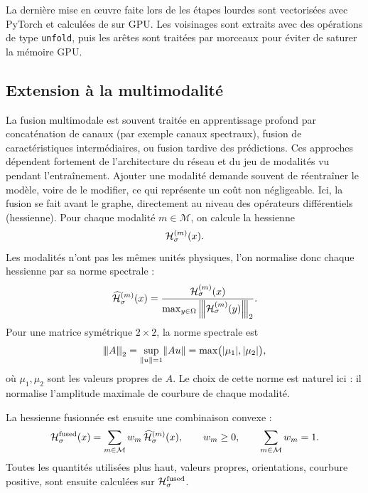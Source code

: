 La dernière mise en œuvre \cite{BibiISPRS} faite lors de les étapes lourdes sont vectorisées avec PyTorch et calculées de sur GPU. Les voisinages sont extraits avec des opérations de type \texttt{unfold}, puis les arêtes sont traitées par morceaux pour éviter de saturer la mémoire GPU.

\subsection{Extension à la multimodalité}
\label{subsec:chapIII_multimodalite}

La fusion multimodale est souvent traitée en apprentissage profond par concaténation de canaux (par exemple canaux spectraux), fusion de caractéristiques intermédiaires, ou fusion tardive des prédictions. 
Ces approches dépendent fortement de l'architecture du réseau et du jeu de modalités vu pendant l'entraînement. Ajouter une modalité demande souvent de réentraîner le modèle, voire de le modifier, ce qui représente un coût non négligeable.
Ici, la fusion se fait avant le graphe, directement au niveau des opérateurs différentiels (hessienne). Pour chaque modalité $m\in\mathcal M$, on calcule la hessienne
\[
    \mathcal H^{(m)}_\sigma(x).
\]
Les modalités n'ont pas les mêmes unités physiques, l'on normalise donc chaque hessienne par sa norme spectrale \cite{AvrachenkovDreveton2022} :
\begin{equation}
    \widehat{\mathcal H}^{(m)}_\sigma(x)
    =
    \frac{\mathcal H^{(m)}_\sigma(x)}{\max_{y\in\Omega}\left\lvert\mkern-2mu\left\lvert\mkern-2mu\left\lvert \mathcal H^{(m)}_\sigma(y) \right\rvert\mkern-2mu\right\rvert\mkern-2mu\right\rvert_2}.
    \label{eq:chapIII_hessian_norm}
\end{equation}
Pour une matrice symétrique $2\times2$, la norme spectrale est
\begin{equation}
    \left\lvert\mkern-2mu\left\lvert\mkern-2mu\left\lvert A \right\rvert\mkern-2mu\right\rvert\mkern-2mu\right\rvert_2
    =
    \sup_{\lVert u \rVert=1}\lVert Au \rVert
    =
    \max\bigl(|\mu_1|,|\mu_2|\bigr),
    \label{eq:chapIII_spectral_norm}
\end{equation}
où $\mu_1,\mu_2$ sont les valeurs propres de $A$. Le choix de cette norme est naturel ici : il normalise l'amplitude maximale de courbure de chaque modalité.

La hessienne fusionnée est ensuite une combinaison convexe :
\begin{equation}
    \mathcal H^{\mathrm{fused}}_\sigma(x)
    =
    \sum_{m\in\mathcal M} w_m\,\widehat{\mathcal H}^{(m)}_\sigma(x),
    \qquad
    w_m\ge0,
    \qquad
    \sum_{m\in\mathcal M} w_m=1.
    \label{eq:chapIII_fusion}
\end{equation}
Toutes les quantités utilisées plus haut, valeurs propres, orientations, courbure positive, sont ensuite calculées sur $\mathcal H^{\mathrm{fused}}_\sigma$.

